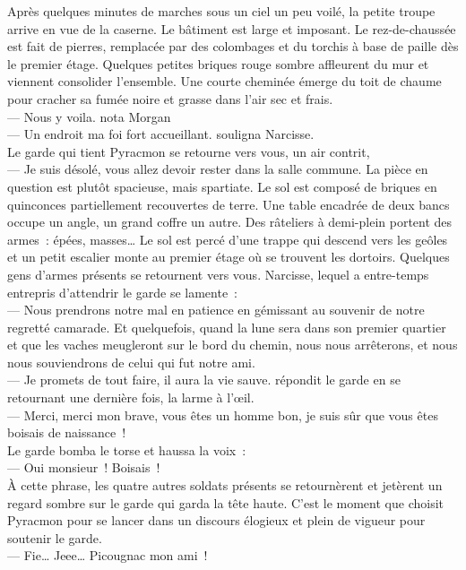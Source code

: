 \documentclass[french, a4paper, 12pt]{article}
\begin{document}
Après quelques minutes de marches sous un ciel un peu voilé, la petite troupe arrive en vue de la caserne. Le bâtiment est large et imposant. Le rez-de-chaussée est fait de pierres, remplacée par des colombages et du torchis à base de paille dès le premier étage. Quelques petites briques rouge sombre affleurent du mur et viennent consolider l'ensemble. Une courte cheminée émerge du toit de chaume pour cracher sa fumée noire et grasse dans l'air sec et frais.\\
--- Nous y voila. nota Morgan\\
--- Un endroit ma foi fort accueillant. souligna Narcisse.\\
Le garde qui tient Pyracmon se retourne vers vous, un air contrit,\\
--- Je suis désolé, vous allez devoir rester dans la salle commune.
La pièce en question est plutôt spacieuse, mais spartiate. Le sol est composé de briques en quinconces partiellement recouvertes de terre. Une table encadrée de deux bancs occupe un angle, un grand coffre un autre. Des râteliers à demi-plein portent des armes~: épées, masses… Le sol est percé d'une trappe qui descend vers les geôles et un petit escalier monte au premier étage où se trouvent les dortoirs. Quelques gens d'armes présents se retournent vers vous. Narcisse, lequel a entre-temps entrepris d'attendrir le garde se lamente~:\\
--- Nous prendrons notre mal en patience en gémissant au souvenir de notre regretté camarade. Et quelquefois, quand la lune sera dans son premier quartier et que les vaches meugleront sur le bord du chemin, nous nous arrêterons, et nous nous souviendrons de celui qui fut notre ami.\\
--- Je promets de tout faire, il aura la vie sauve. répondit le garde en se retournant une dernière fois, la larme à l'œil.\\
--- Merci, merci mon brave, vous êtes un homme bon, je suis sûr que vous êtes boisais de naissance~!\\
Le garde bomba le torse et haussa la voix~:\\
--- Oui monsieur~! Boisais~!\\
À cette phrase, les quatre autres soldats présents se retournèrent et jetèrent un regard sombre sur le garde qui garda la tête haute. C'est le moment que choisit Pyracmon pour se lancer dans un discours élogieux et plein de vigueur pour soutenir le garde.\\
--- Fie… Jeee… Picougnac mon ami~!\\
\end{document}

